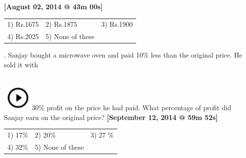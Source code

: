 \documentclass{article}
\begin{document}
	\noindent \textbf{[August 02, 2014 @ 43m 00s]}
	
	\noindent 
	
	\noindent  
	\begin{tabular}{p{1.7in} p{1.6in} p{1.6in}} \\ 
 1) Rs.1675               & 2) Rs.1875        & 3) Rs.1900        \\
4) Rs.2025        & 5) None of these  \\
\end{tabular}
	
	\noindent 
	
	\noindent 
	
	\noindent 
	
	. Sanjay bought a microwave oven and paid 10\% less than the original price. He sold it with
	
	\noindent 
	
	\noindent \noindent \\ \includegraphics*[width=0.60in, height=0.52in]{images/image1}30\% profit on the price he had paid. What percentage of profit did Sanjay earn on the original price?       \textbf{[September 12, 2014 @ 59m 52s]}
	
	\noindent 
	
	\noindent  
	\begin{tabular}{p{1.7in} p{1.6in} p{1.6in}} \\ 
 1) 17\%                    & 2) 20\%              & 3) 27 \%             \\
4) 32\%              & 5) None of these  \\
\end{tabular}
	
	\noindent 
	
	\noindent 
	
	\noindent 
	
	\noindent 
	
	\noindent 
	
	\noindent 
	
	\noindent 
	
	\noindent 
	
	\noindent 
	
	\noindent 
	
	\noindent 
	
	\noindent 
	
	\noindent 
	
\end{document}
